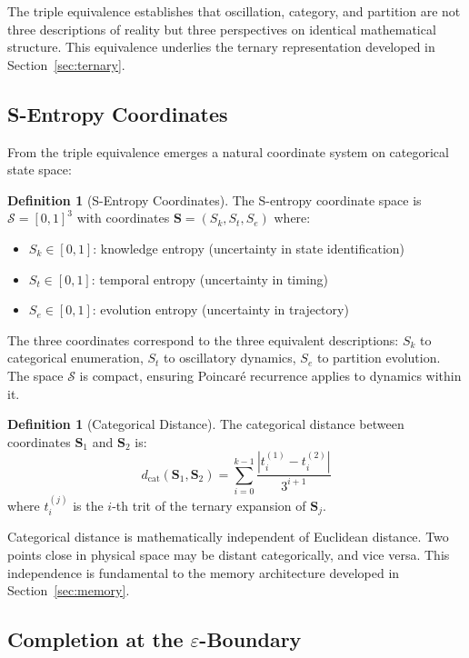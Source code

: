 \documentclass[10pt,twocolumn]{article}
\theoremstyle{definition}
\newtheorem{definition}[theorem]{Definition}
\theoremstyle{remark}
\newcommand{\Sk}{S_k}
\newcommand{\St}{S_t}
\newcommand{\Se}{S_e}
\newcommand{\Scoord}{\mathbf{S}}
\newcommand{\Sspace}{\mathcal{S}}
\begin{document}
The triple equivalence establishes that oscillation, category, and partition are not three descriptions of reality but three perspectives on identical mathematical structure. This equivalence underlies the ternary representation developed in Section~\ref{sec:ternary}.

\subsection{S-Entropy Coordinates}

From the triple equivalence emerges a natural coordinate system on categorical state space:

\begin{definition}[S-Entropy Coordinates]
The S-entropy coordinate space is $\Sspace = [0,1]^3$ with coordinates $\Scoord = (\Sk, \St, \Se)$ where:
\begin{itemize}[nosep]
\item $\Sk \in [0,1]$: knowledge entropy (uncertainty in state identification)
\item $\St \in [0,1]$: temporal entropy (uncertainty in timing)
\item $\Se \in [0,1]$: evolution entropy (uncertainty in trajectory)
\end{itemize}
\end{definition}

The three coordinates correspond to the three equivalent descriptions: $\Sk$ to categorical enumeration, $\St$ to oscillatory dynamics, $\Se$ to partition evolution. The space $\Sspace$ is compact, ensuring Poincar\'{e} recurrence applies to dynamics within it.

\begin{definition}[Categorical Distance]
The categorical distance between coordinates $\Scoord_1$ and $\Scoord_2$ is:
\begin{equation}
d_{\text{cat}}(\Scoord_1, \Scoord_2) = \sum_{i=0}^{k-1} \frac{|t_i^{(1)} - t_i^{(2)}|}{3^{i+1}}
\end{equation}
where $t_i^{(j)}$ is the $i$-th trit of the ternary expansion of $\Scoord_j$.
\end{definition}

Categorical distance is mathematically independent of Euclidean distance. Two points close in physical space may be distant categorically, and vice versa. This independence is fundamental to the memory architecture developed in Section~\ref{sec:memory}.

\subsection{Completion at the $\varepsilon$-Boundary}
\end{document}
